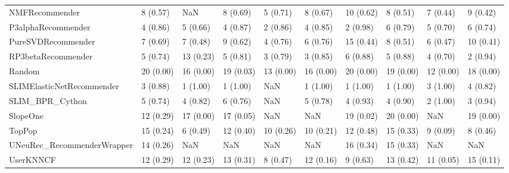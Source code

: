 \begin{tabular}{llllllllll}
                     NMFRecommender &                 8 (0.57) &         NaN &      8 (0.69) &     5 (0.71) &             8 (0.67) &           10 (0.62) &          8 (0.51) &           7 (0.44) &          9 (0.42) \\
                 P3alphaRecommender &                 4 (0.86) &    5 (0.66) &      4 (0.87) &     2 (0.86) &             4 (0.85) &            2 (0.98) &          6 (0.79) &           5 (0.70) &          6 (0.74) \\
                 PureSVDRecommender &                 7 (0.69) &    7 (0.48) &      9 (0.62) &     4 (0.76) &             6 (0.76) &           15 (0.44) &          8 (0.51) &           6 (0.47) &         10 (0.41) \\
                 RP3betaRecommender &                 5 (0.74) &   13 (0.23) &      5 (0.81) &     3 (0.79) &             3 (0.85) &            6 (0.88) &          5 (0.88) &           4 (0.70) &          2 (0.94) \\
                             Random &                20 (0.00) &   16 (0.00) &     19 (0.03) &    13 (0.00) &            16 (0.00) &           20 (0.00) &         19 (0.00) &          12 (0.00) &         18 (0.00) \\
          SLIMElasticNetRecommender &                 3 (0.88) &    1 (1.00) &      1 (1.00) &          NaN &             1 (1.00) &            1 (1.00) &          1 (1.00) &           3 (1.00) &          4 (0.82) \\
                    SLIM\_BPR\_Cython &                 5 (0.74) &    4 (0.82) &      6 (0.76) &          NaN &             5 (0.78) &            4 (0.93) &          4 (0.90) &           2 (1.00) &          3 (0.94) \\
                           SlopeOne &                12 (0.29) &   17 (0.00) &     17 (0.05) &          NaN &                  NaN &           19 (0.02) &         20 (0.00) &                NaN &         19 (0.00) \\
                             TopPop &                15 (0.24) &    6 (0.49) &     12 (0.40) &    10 (0.26) &            10 (0.21) &           12 (0.48) &         15 (0.33) &           9 (0.09) &          8 (0.46) \\
         UNeuRec\_RecommenderWrapper &                14 (0.26) &         NaN &           NaN &          NaN &                  NaN &           16 (0.34) &         15 (0.33) &                NaN &               NaN \\
                          UserKNNCF &                12 (0.29) &   12 (0.23) &     13 (0.31) &     8 (0.47) &            12 (0.16) &            9 (0.63) &         13 (0.42) &          11 (0.05) &         15 (0.11) \\
\bottomrule
\end{tabular}
